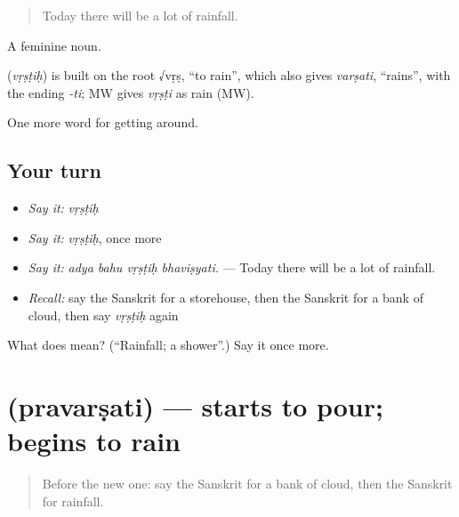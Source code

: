 \begin{quote}
Today there will be a lot of rainfall.
\end{quote}

A feminine noun.

\begin{cousinweb}
\textbf{} (\emph{vṛṣṭiḥ}) is built on the root √vṛṣ, \textquotedblleft{}to rain\textquotedblright{}, which also gives \emph{varṣati}, \textquotedblleft{}rains\textquotedblright{}, with the ending \emph{-ti}; MW gives \emph{vṛṣṭi} as rain (MW).
\end{cousinweb}

\begin{grammarlens}[title={What you've built}]
One more word for getting around.
\end{grammarlens}

\subsection*{Your turn}
\begin{itemize}
\raggedright
  \item \emph{Say it:} \emph{vṛṣṭiḥ}
  \item \emph{Say it:} \emph{vṛṣṭiḥ}, once more
  \item \emph{Say it:} \emph{adya bahu vṛṣṭiḥ bhaviṣyati.} — Today there will be a lot of rainfall.
  \item \emph{Recall:} say the Sanskrit for a storehouse, then the Sanskrit for a bank of cloud, then say \emph{vṛṣṭiḥ} again
\end{itemize}

\begin{tcolorbox}[breakable,colback=teal!4,colframe=teal!35!black,title={Before you move on}]
What does  mean? (\textquotedblleft{}Rainfall; a shower\textquotedblright{}.) Say it once more.
\end{tcolorbox}
\section[\texorpdfstring{\sk{प्रवर्षति} (pravarṣati)}{प्रवर्षति (pravarṣati)}]{ (pravarṣati) — starts to pour; begins to rain}

\label{lesson:SA-C436-pravarsati}



\begin{quote}
Before the new one: say the Sanskrit for a bank of cloud, then the Sanskrit for rainfall.
\end{quote}

